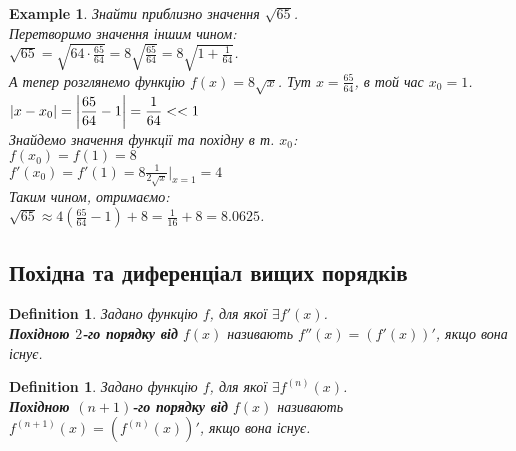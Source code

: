 \documentclass[a4paper, 14pt]{article}
\def\huge{\displaystyle}
\theoremstyle{theoremdd}
\theoremstyle{theoremdd}
\newtheorem{definition}[theorem]{Definition}
\theoremstyle{theoremdd}
\theoremstyle{theoremdd}
\newtheorem{example}[theorem]{Example}
\theoremstyle{theoremdd}
\theoremstyle{theoremdd}
\theoremstyle{theoremdd}
\theoremstyle{theoremdd}
\begin{document}
\begin{example}
Знайти приблизно значення $\sqrt{65}$.\\
Перетворимо значення іншим чином:\\
$\sqrt{65} \huge = \sqrt{64 \cdot \frac{65}{64}} = 8 \sqrt{\frac{65}{64}} = 8 \sqrt{1 + \frac{1}{64}}$.\\
А тепер розглянемо функцію $f(x) = 8\sqrt{x}$. Тут $x = \huge \frac{65}{64}$, в той час $x_0 = 1$.\\
$|x-x_0| = \huge \abs{\frac{65}{64} - 1} = \frac{1}{64} <<1$\\
Знайдемо значення функції та похідну в т. $x_0$:\\
$f(x_0) = f(1) = 8$\\
$f'(x_0) = f'(1) = \huge 8\frac{1}{2 \sqrt{x}} |_{x = 1} = 4$\\
Таким чином, отримаємо:\\
$\sqrt{65} \approx \huge 4\left(\frac{65}{64}-1\right)+8 = \frac{1}{16} + 8 = 8.0625$.
\end{example}

\subsection{Похідна та диференціал вищих порядків}
\begin{definition}
Задано функцію $f$, для якої $\exists f'(x)$.\\
\textbf{Похідною $2$-го порядку від} $f(x)$ називають $f''(x) = (f'(x))'$, якщо вона існує.
\end{definition}

\begin{definition}
Задано функцію $f$, для якої $\exists f^{(n)}(x)$.\\
\textbf{Похідною $(n+1)$-го порядку від} $f(x)$ називають $f^{(n+1)}(x) = (f^{(n)}(x))'$, якщо вона існує.
\end{definition}
\end{document}
